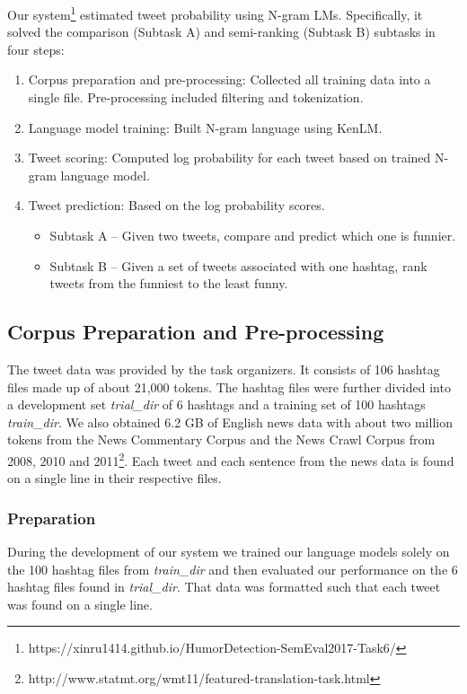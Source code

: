 \documentclass[11pt,a4paper]{article}
\begin{document}
Our system\footnote{https://xinru1414.github.io/HumorDetection-SemEval2017-Task6/} estimated tweet probability using N-gram LMs. 
Specifically, it solved the comparison (Subtask A) and semi-ranking (Subtask B) subtasks in four steps:

\begin{enumerate}
\item Corpus preparation and pre-processing: Collected all training 
data into a single file.
Pre-processing included filtering and tokenization.
\item Language model training: Built N-gram language using KenLM.
\item Tweet scoring: Computed log probability for each tweet based 
on trained N-gram language model. 
\item Tweet prediction: Based on the log probability scores.   

\begin{itemize}
\item Subtask A -- Given two tweets, compare and predict which one is funnier. 
\item Subtask B -- Given a set of tweets associated with one hashtag, rank 
tweets from the funniest to the least funny.

\end{itemize}
\end{enumerate}

\subsection{Corpus Preparation and Pre-processing}

The tweet data was provided by the task organizers. It consists of 106 hashtag files made up of about 21,000 tokens. The hashtag files
were further divided into a development set \textit{trial\_dir} of 6 hashtags and a training set of 100 hashtags \textit{train\_dir}. 
We also obtained 6.2 GB of English news data with about two million tokens from the News 
Commentary Corpus and the News Crawl Corpus from 2008, 2010 and 2011\footnote{http://www.statmt.org/wmt11/featured-translation-task.html}.   
Each tweet and each sentence from the news data is found on a single line in their respective files.

\subsubsection{Preparation}

During the development of our system we trained our language models solely on the 100 hashtag files from \textit{train\_dir}
and then evaluated our performance on the 6 hashtag files found in \textit{trial\_dir}. That data was formatted such that each
tweet was found on a single line.  
\end{document}
